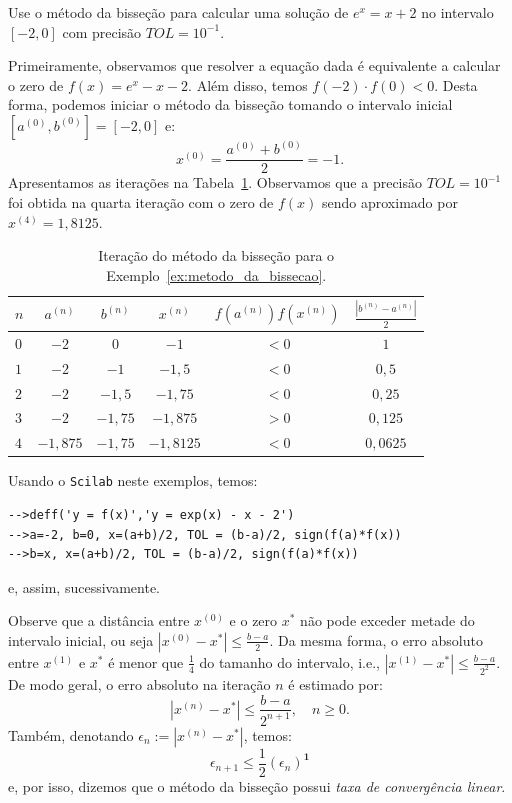 \begin{ex}\label{ex:metodo_da_bissecao}Use o método da bisseção para calcular uma solução de $e^x = x + 2$ no intervalo $[-2, 0]$ com precisão $TOL = 10^{-1}$.
  \begin{sol}
    Primeiramente, observamos que resolver a equação dada é equivalente a calcular o zero de $f(x) = e^x - x - 2$. Além disso, temos $f(-2)\cdot f(0) < 0$. Desta forma, podemos iniciar o método da bisseção tomando o intervalo inicial $[a^{(0)}, b^{(0)}] = [-2, 0]$ e:
    \begin{equation*}
      x^{(0)} = \frac{a^{(0)} + b^{(0)}}{2} = -1.
    \end{equation*}
Apresentamos as iterações na Tabela~\ref{tab:metodo_da_bissecao}. Observamos que a precisão $TOL = 10^{-1}$ foi obtida na quarta iteração com o zero de $f(x)$ sendo aproximado por $x^{(4)} = 1,8125$.
    \begin{table}
      \centering
      \begin{tabular}{l|ccc|c|c}\hline
        $n$ & $a^{(n)}$ & $b^{(n)}$ & $x^{(n)}$ & $f(a^{(n)})f(x^{(n)})$ & $\displaystyle \frac{|b^{(n)}-a^{(n)}|}{2}$\\\hline
        $0$ & $-2$ & $0$ & $-1$ & $< 0$ & $1$\\
        $1$ & $-2$ & $-1$ & $-1,5$ & $<0$ & $0,5$\\
        $2$ & $-2$ & $-1,5$ & $-1,75$ & $<0$ & $0,25$\\
        $3$ & $-2$ & $-1,75$ & $-1,875$ & $>0$ & $0,125$\\
        $4$ & $-1,875$ & $-1,75$ & $-1,8125$ & $<0$ & $0,0625$\\\hline
      \end{tabular}
      \caption{Iteração do método da bisseção para o Exemplo~\ref{ex:metodo_da_bissecao}.}
      \label{tab:metodo_da_bissecao}
    \end{table}
\ifisscilab
Usando o \verb+Scilab+ neste exemplos, temos:
\begin{verbatim}
-->deff('y = f(x)','y = exp(x) - x - 2')
-->a=-2, b=0, x=(a+b)/2, TOL = (b-a)/2, sign(f(a)*f(x))
-->b=x, x=(a+b)/2, TOL = (b-a)/2, sign(f(a)*f(x))
\end{verbatim}
e, assim, sucessivamente.
\fi    
  \end{sol}
\end{ex}

Observe que a distância entre $x^{(0)}$ e o zero $x^*$ não pode exceder metade do intervalo inicial, ou seja $|x^{(0)}-x^*|\leq \frac{b-a}{2}$. Da mesma forma, o erro absoluto entre $x^{(1)}$ e $x^*$ é menor que $\frac{1}{4}$ do tamanho do intervalo, i.e., $|x^{(1)}-x^*|\leq \frac{b-a}{2^2}$. De modo geral, o erro absoluto na iteração $n$ é estimado por:
\begin{equation*}
  |x^{(n)}-x^*|\leq \frac{b-a}{2^{n+1}},\quad n\geq 0.
\end{equation*}
Também, denotando $\epsilon_n := |x^{(n)} - x^*|$, temos:
\begin{equation*}
\epsilon_{n+1}\leq \frac{1}{2}\left(\epsilon_n\right)^{\pmb{1}}  
\end{equation*}
e, por isso, dizemos que o método da bisseção possui \emph{taxa de convergência linear}. 

